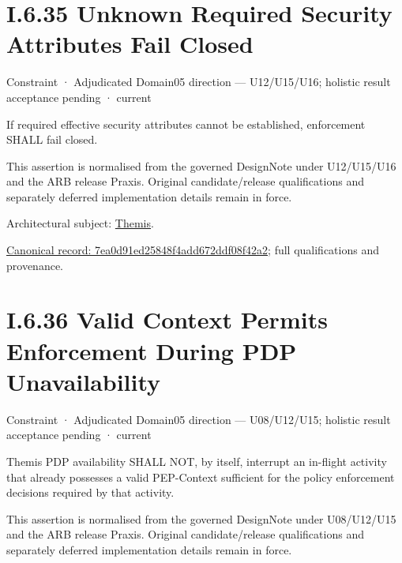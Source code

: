 \section*{I.6.35 Unknown Required Security Attributes Fail Closed}
\label{navigation:I.6.35}

\label{element:7ea0d91ed25848f4add672ddf08f42a2}
{\small Constraint · Adjudicated Domain05 direction — U12/U15/U16; holistic result acceptance pending · current}\par

If required effective security attributes cannot be established, enforcement SHALL fail closed.



This assertion is normalised from the governed DesignNote under U12/U15/U16 and the ARB release Praxis. Original candidate/release qualifications and separately deferred implementation details remain in force.



Architectural subject: \hyperref[element:899d34ec491948b68aad09e507dea6d1]{Themis}.


{\footnotesize \href{../../../../../../../continuum/motivation/constraint/7ea0d91ed25848f4add672ddf08f42a2.md}{Canonical record: 7ea0d91ed25848f4add672ddf08f42a2}; full qualifications and provenance.}\par
\section*{I.6.36 Valid Context Permits Enforcement During PDP Unavailability}
\label{navigation:I.6.36}

\label{element:5a6285eb1a1646e1badd693b8c175f01}
{\small Constraint · Adjudicated Domain05 direction — U08/U12/U15; holistic result acceptance pending · current}\par

Themis PDP availability SHALL NOT, by itself, interrupt an in-flight activity that already possesses a valid PEP-Context sufficient for the policy enforcement decisions required by that activity.



This assertion is normalised from the governed DesignNote under U08/U12/U15 and the ARB release Praxis. Original candidate/release qualifications and separately deferred implementation details remain in force.



